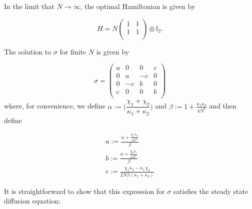\documentclass[11pt,a4paper]{article}
\numberwithin{equation}{section}
\begin{document}
	In the limit that $N \rightarrow \infty$, the optimal Hamiltonian is given by
	
	\begin{equation*}
	H = N \begin{pmatrix}
	1 & 1  \\
	1 & 1\\
	\end{pmatrix} \otimes \mathbb{I}_2.
	\end{equation*}
	
	The solution to $\sigma$ for finite $N$ is given by 
	
	\begin{equation*}
	\sigma = \begin{pmatrix}
	a & 0 & 0 & c\\
	0 & a & -c & 0\\
	0 & -c & b & 0 \\
	c & 0 & 0 & b\\
	\end{pmatrix}
	\end{equation*}	
	where, for convenience, we define $\alpha := \Big(\dfrac{\chi_1 + \chi_2}{\kappa_1 + \kappa_2}\Big)$ and $\beta := 1 + \frac{\kappa_1 \kappa_2}{4N^2}$ and then define
	
	
	\begin{align*}
	&a := \frac{\alpha + \frac{\chi_1 \kappa_2}{4N^2}}{\beta}&\\
	&b := \frac{\alpha + \frac{\chi_2 \kappa_1}{4N^2}}{\beta}&\\
	&c := \frac{\chi_1 \kappa_2 - \kappa_1 \chi_2}{2N\beta (\kappa_1+\kappa_2)}&		
	\end{align*}


It is straightforward to show that this expression for $\sigma$ satisfies the steady state diffusion equation:
\end{document}
